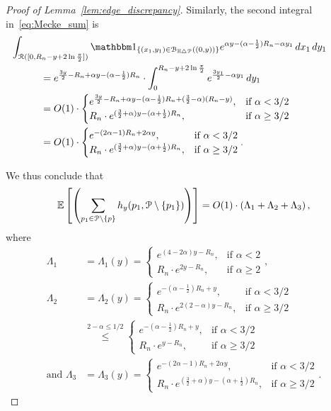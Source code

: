 \begin{proof}[Proof of Lemma~\ref{lem:edge_discrepancy}]
Similarly, the second integral in~\eqref{eq:Mecke_sum} is
\begin{align*}
	&\hspace{-30pt}\int_{\Rcal ([0, R_n - y + 2 \ln \frac{\pi}{2}])} \ind{(x_1,y_1) \in \BallSym{(0,y)}} e^{\alpha y - (\alpha - \frac{1}{2})R_n - \alpha y_1} \, dx_1 \, dy_1\\
	&= e^{\frac{3y}{2} - R_n + \alpha y - (\alpha - \frac{1}{2})R_n} 
    	\cdot \int_{0}^{R_n - y + 2 \ln \frac{\pi}{2}} e^{\frac{3y_1}{2}-\alpha y_1} \, dy_1\\
	&= O(1)\cdot 
	\begin{cases} 
	e^{\frac{3y}{2} - R_n + \alpha y - (\alpha - \frac{1}{2})R_n + (\frac{3}{2} - \alpha)(R_n-y)} 
	, & \mbox{if $\alpha < 3/2$} \\ 
	R_n \cdot e^{(\frac{3}{2} +\alpha)y -  (\alpha + \frac{1}{2})R_n}, & \mbox{if 
	$\alpha \geq 3/2$}
	\end{cases}	\\
	&= O(1) \cdot 
	\begin{cases}
	  e^{-(2\alpha-1) R_n + 2 \alpha y}, & \mbox{if $\alpha < 3/2$} \\
	  R_n \cdot e^{(\frac{3}{2} +\alpha)y -  (\alpha + \frac{1}{2})R_n}, & \mbox{if 
	$\alpha \geq 3/2$}
	\end{cases}.
\end{align*}

We thus conclude that 
\begin{equation} \label{eq:upper_bound_faulty_edges} 
\mathbb{E}\left[\left( \sum_{p_1 \in {\mathcal P} \setminus\{p\}} 
		h_y (p_1, {\mathcal P} \setminus \{ p_1 \})\right)\right]  = O(1) \cdot 
\left( \Lambda_1 + \Lambda_2 + \Lambda_3 \right),
\end{equation}
where 
\begin{align*}
 \Lambda_1 &= \Lambda_1 (y) =\begin{cases}
	e^{(4-2\alpha) y - R_n}, & \mbox{if $\alpha < 2$} \\
	R_n \cdot e^{2y - R_n}, & \mbox{if $\alpha \geq 2$}
	\end{cases},  \\
\Lambda_2 &= \Lambda_2 (y) = 
\begin{cases}
	e^{-(\alpha - \frac{1}{2})R_n +y}, & \mbox{if $\alpha < 3/2$} \\
	R_n \cdot  e^{2(2-\alpha)y - R_n}, & \mbox{if $\alpha \geq 3/2$}
	\end{cases} \\
	&\stackrel{2-\alpha \leq 1/2}{\leq}
	\begin{cases}
	e^{-(\alpha - \frac{1}{2})R_n +y}, & \mbox{if $\alpha < 3/2$} \\
	R_n \cdot  e^{y - R_n}, & \mbox{if $\alpha \geq 3/2$}
	\end{cases}\\
\mbox{and } \Lambda_3 &= \Lambda_3 (y) = 
\begin{cases}
	  e^{-(2\alpha-1) R_n + 2 \alpha y}, & \mbox{if $\alpha < 3/2$} \\
	  R_n \cdot e^{(\frac{3}{2} +\alpha)y -  (\alpha + \frac{1}{2})R_n}, & \mbox{if 
	$\alpha \geq 3/2$}
	\end{cases}.
\end{align*}


\end{proof}
